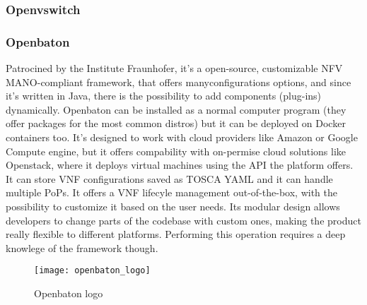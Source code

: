 \subsubsection{Openvswitch} 
\subsubsection{Openbaton}
\label{chap:prjan:sec:tech:sub:other:sub:openbaton}
Patrocined by the Institute Fraunhofer, it's a open-source, customizable NFV 
MANO-compliant framework, that offers manyconfigurations options, and since it's 
written in Java, there is the possibility to add components (plug-ins) 
dynamically. Openbaton can be installed as a normal computer program (they 
offer packages for the most common distros) but it can be deployed on Docker 
containers too. It's designed to work with cloud providers like Amazon or 
Google Compute engine, but it offers compability with on-permise cloud 
solutions like Openstack, where it deploys virtual machines using the API
the platform offers. It can store VNF configurations saved as TOSCA
YAML and it can handle multiple
PoPs. It offers a VNF lifecyle management
out-of-the-box, with the possibility to customize it based on the user needs.
Its modular design allows developers to change parts of the codebase with custom
ones, making the product really flexible to different platforms. Performing this
operation requires a deep knowlege of the framework though.
\begin{figure}[h]
 \centering \texttt{[image: openbaton\_logo]}
 \caption{Openbaton logo}
 \label{chap:prjan:img:openbaton_logo}
\end{figure}
